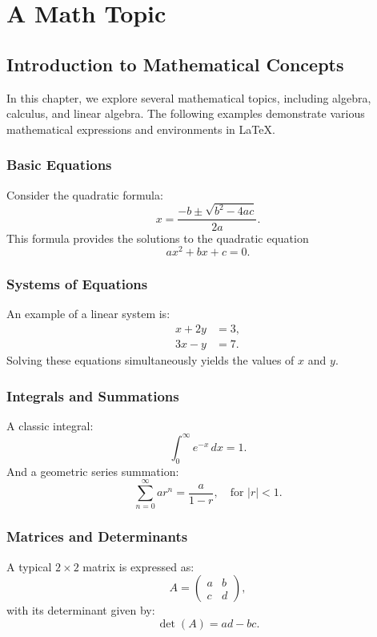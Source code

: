 \chapter{A Math Topic}

\section{Introduction to Mathematical Concepts}

In this chapter, we explore several mathematical topics, including algebra, calculus, and linear algebra. The following examples demonstrate various mathematical expressions and environments in \LaTeX.

\subsection{Basic Equations}

Consider the quadratic formula:
\[
x = \frac{-b \pm \sqrt{b^2 - 4ac}}{2a}.
\]
This formula provides the solutions to the quadratic equation
\[
ax^2 + bx + c = 0.
\]

\subsection{Systems of Equations}

An example of a linear system is:
\begin{align*}
x + 2y &= 3, \\
3x - y &= 7.
\end{align*}
Solving these equations simultaneously yields the values of \(x\) and \(y\).

\subsection{Integrals and Summations}

A classic integral:
\[
\int_0^\infty e^{-x} \, dx = 1.
\]
And a geometric series summation:
\[
\sum_{n=0}^{\infty} ar^n = \frac{a}{1-r}, \quad \text{for } |r| < 1.
\]

\subsection{Matrices and Determinants}

A typical \(2 \times 2\) matrix is expressed as:
\[
A = \begin{pmatrix} a & b \\ c & d \end{pmatrix},
\]
with its determinant given by:
\[
\det(A) = ad - bc.
\]

